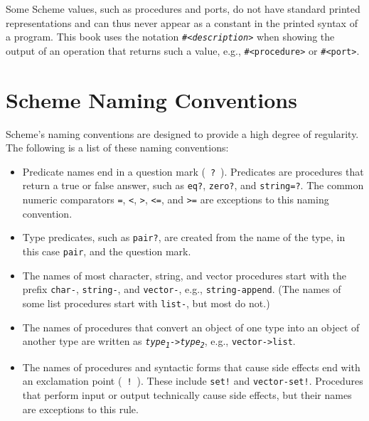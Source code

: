 Some Scheme values, such as procedures and ports, do not have standard
printed representations and can thus never appear as a constant in the
printed syntax of a program.
This book uses the notation \texttt{\#{}\textless{}\textit{description}\textgreater{}} when showing the
output of an operation that returns such a value, e.g.,
\texttt{\#{}\textless{}procedure\textgreater{}} or \texttt{\#{}\textless{}port\textgreater{}}.


\section{\label{intro_g2}\label{intro_h2}Scheme Naming Conventions\label{intro_SECTINTRONAMING}}



Scheme's \label{intro_s45}naming conventions are designed to provide a high degree
of regularity.
The following is a list of these naming conventions:

\begin{itemize}
\item 
Predicate names end in a
\label{intro_s46}\label{intro_s47}question mark ( \texttt{?} ).
Predicates are procedures that return a true or false
answer, such as \texttt{eq?}, \texttt{zero?}, and \texttt{string=?}.
The common numeric comparators \texttt{=}, \texttt{\textless{}}, \texttt{\textgreater{}}, \texttt{\textless{}=},
and \texttt{\textgreater{}=} are exceptions to this naming convention.

\item 
Type \label{intro_s48}predicates, such as \texttt{pair?}, are created from
the name of the type, in this case \texttt{pair}, and the question mark.

\item 
The names of most character, string, and vector
procedures start with the prefix \texttt{char-}, \texttt{string-}, and
\texttt{vector-}, e.g., \texttt{string-append}.
(The names of some list procedures start with \texttt{list-}, but most
do not.)

\item 
The names of procedures that convert an object of
one type into an object of another type are written as
\label{intro_s49}\texttt{\textit{type\textsubscript{1}}-\textgreater{}\textit{type\textsubscript{2}}},
e.g., \texttt{vector-\textgreater{}list}.

\item 
The names of procedures and syntactic forms
that cause side effects end with an
\label{intro_s50}\label{intro_s51}exclamation point ( \texttt{!} ).
These include \texttt{set!} and \texttt{vector-set!}.
Procedures that perform input or output technically cause \label{intro_s52}side effects,
but their names are exceptions to this rule.

\end{itemize}


